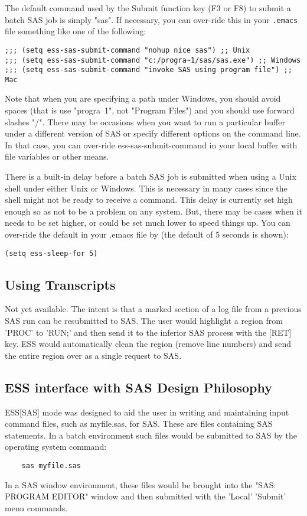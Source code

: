 \documentclass{article}
\begin{document}
The default command used by the Submit function key (F3 or F8) to
submit a batch SAS job is simply "sas".  If necessary, you can
over-ride this in your \verb+.emacs+ file something like one of the
following:
\begin{verbatim}
;;; (setq ess-sas-submit-command "nohup nice sas") ;; Unix
;;; (setq ess-sas-submit-command "c:/progra~1/sas/sas.exe") ;; Windows
;;; (setq ess-sas-submit-command "invoke SAS using program file") ;; Mac
\end{verbatim}
Note that when you are specifying a path under Windows, you should
avoid spaces (that is use "progra~1", not "Program Files") and you
should use forward slashes "/".  There may be occasions when you want
to run a particular buffer under a different version of SAS or specify
different options on the command line.  In that case, you can
over-ride ess-sas-submit-command in your local buffer with file
variables or other means.

There is a built-in delay before a batch SAS job is submitted when using
a Unix shell under either Unix or Windows.  This is necessary in many cases 
since the shell might not be ready to receive a command.  This delay is 
currently set high enough so as not to be a problem on any system.  But,
there may be cases when it needs to be set higher, or could be set much
lower to speed things up.  You can over-ride the default in your .emacs
file by (the default of 5 seconds is shown):
\begin{verbatim}
(setq ess-sleep-for 5)
\end{verbatim}


\subsection{Using Transcripts}
\label{sec:SAS:trans}

Not yet available.  The intent is that a marked section of a log file
from a previous SAS run can be resubmitted to SAS.  The user would
highlight a region from 'PROC' to 'RUN;' and then send it to the
inferior SAS process with the [RET] key.  ESS would automatically
clean the region (remove line numbers) and send the entire region over
as a single request to SAS.


\subsection{ESS interface with SAS Design Philosophy}
\label{sec:SAS:phil}

ESS[SAS] mode was designed to aid the user in writing and maintaining
input command files, such as myfile.sas, for SAS.  These are files
containing SAS statements.  In a batch environment such files would be
submitted to SAS by the operating system command:
\begin{verbatim}
    sas myfile.sas
\end{verbatim}
In a SAS window environment, these files would be brought into the
"SAS: PROGRAM EDITOR" window and then submitted with the 'Local' 'Submit'
menu commands.
\end{document}
